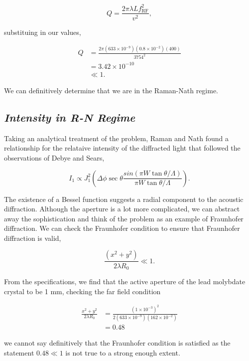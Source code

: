 \documentclass[aps,prl,reprint,10pt,amsmath,amssymb,superscriptaddress,a4paper]{revtex4-2}
\begin{document}
\begin{equation*}
    Q = \frac{2\pi \lambda L f_{\text{RF}}^2}{v^2},
\end{equation*}

substituing in our values,

\begin{align*}
    Q &= \frac{2\pi (633\times10^{-9})(0.8\times10^{-2})(400)}{3754^2} \\
    &= 3.42 \times 10^{-10} \\
    &\ll 1.
\end{align*}

We can definitively determine that we are in the Raman-Nath regime.

\subsection{\normalfont\textit{Intensity in R-N Regime}}
Taking an analytical treatment of the problem, Raman and Nath \citep{RamanNath} found a relationship for the relataive intensity of the diffracted light 
that followed the observations of Debye and Sears,

\begin{equation} \label{eqn:ramannath}
    I_1 \propto J_1^2\left(\Delta\phi \sec{\theta} \frac{sin(\pi W \tan{\theta}/\Lambda)}{\pi W \tan{\theta}/\Lambda}\right).
\end{equation}

The existence of a Bessel function suggests a radial component to the acoustic diffraction. Although the aperture is a lot more complicated, we can abstract 
away the sophistication and think of the problem as an example of Fraunhofer diffraction. We can check the Fraunhofer condition to ensure that Fraunhofer 
diffraction is valid,

\begin{equation} \label{eqn:fraunhofer}
    \frac{(x^2+y^2)}{2\lambda R_0} \ll 1.
\end{equation}

From the specifications, we find that the active aperture of the lead molybdate crystal to be 1 mm, checking the far field condition

\begin{align*}
    \frac{{x^2+y^2}}{2\lambda R_0} &= \frac{(1\times10^{-3})^2}{2(633\times10^{-9})(162\times10^{-2})} \\
    &= 0.48
\end{align*}

we cannot say definitively that the Fraunhofer condition is satisfied as the statement $0.48 \ll 1$ is not true to a strong enough extent.
\end{document}
